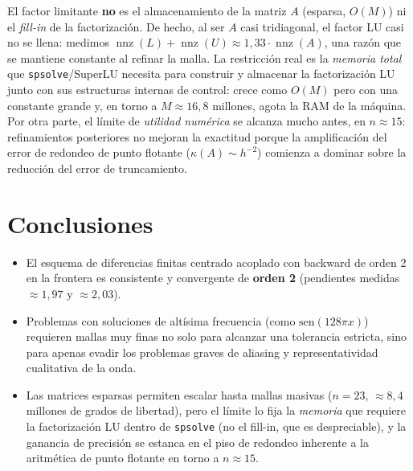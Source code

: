 \documentclass[]{report}
\begin{document}
El factor limitante \textbf{no} es el almacenamiento de la matriz $A$ (esparsa, $O(M)$) ni el \emph{fill-in} de la factorización. De hecho, al ser $A$ casi tridiagonal, el factor LU casi no se llena: medimos $\operatorname{nnz}(L)+\operatorname{nnz}(U)\approx1{,}33\cdot\operatorname{nnz}(A)$, una razón que se mantiene constante al refinar la malla. La restricción real es la \emph{memoria total} que \texttt{spsolve}/SuperLU necesita para construir y almacenar la factorización LU junto con sus estructuras internas de control: crece como $O(M)$ pero con una constante grande y, en torno a $M\approx16{,}8$ millones, agota la RAM de la máquina. Por otra parte, el límite de \emph{utilidad numérica} se alcanza mucho antes, en $n\approx15$: refinamientos posteriores no mejoran la exactitud porque la amplificación del error de redondeo de punto flotante ($\kappa(A)\sim h^{-2}$) comienza a dominar sobre la reducción del error de truncamiento.

\section*{Conclusiones}

\begin{itemize}
  \item El esquema de diferencias finitas centrado acoplado con backward de orden 2 en la frontera es consistente y convergente de \textbf{orden 2} (pendientes medidas $\approx1{,}97$ y $\approx2{,}03$).
  \item Problemas con soluciones de altísima frecuencia (como $\text{sen}(128\pi x)$) requieren mallas muy finas no solo para alcanzar una tolerancia estricta, sino para apenas evadir los problemas graves de aliasing y representatividad cualitativa de la onda.
  \item Las matrices esparsas permiten escalar hasta mallas masivas ($n=23$, $\approx 8{,}4$ millones de grados de libertad), pero el límite lo fija la \emph{memoria} que requiere la factorización LU dentro de \texttt{spsolve} (no el fill-in, que es despreciable), y la ganancia de precisión se estanca en el piso de redondeo inherente a la aritmética de punto flotante en torno a $n\approx15$.
\end{itemize}
\end{document}
